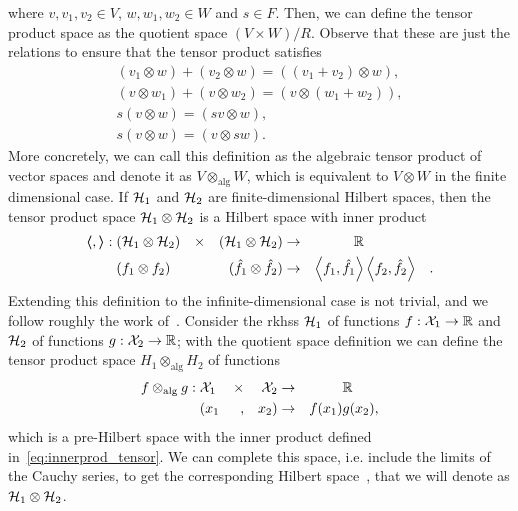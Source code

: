 where $v, v_1, v_2 \in V$, $w, w_1, w_2 \in W$ and $s \in F$. Then, we can define the tensor product space as the quotient space $(V \times W)/R$. Observe that these are just the relations to ensure that the tensor product satisfies 
\begin{align*}
    (v_1 \otimes w) + (v_2 \otimes w) = ((v_1 + v_2) \otimes w),\\
    (v \otimes w_1) + (v \otimes w_2) = (v \otimes (w_1 + w_2)), \\
    s(v \otimes w) = (sv \otimes w),                    \\
    s(v \otimes w) = (v \otimes sw).
\end{align*}
More concretely, we can call this definition as the algebraic tensor product of vector spaces and denote it as $V \otimes_{\text{alg}} W$, which is equivalent to $V \otimes W$ in the finite dimensional case.
If $\mathcal{H}_1$ and $\mathcal{H}_2$ are finite-dimensional Hilbert spaces, then the tensor product space $\mathcal{H}_1 \otimes \mathcal{H}_2$ is a Hilbert space with inner product
\begin{equation}
    \label{eq:innerprod_tensor}
    \begin{aligned}
        \dotp{}{}:\; & (\rkhs_1 \otimes \rkhs_2) & \times &  & (\rkhs_1 \otimes \rkhs_2)     & \to & \reals                &                       &   \\
                     & (f_1 \otimes f_2)         &        &  & (\hat{f}_1 \otimes \hat{f}_2) & \to & \dotp{f_1}{\hat{f}_1} & \dotp{f_2}{\hat{f}_2} & .
    \end{aligned}
\end{equation}
%
Extending this definition to the infinite-dimensional case is not trivial, and we follow roughly the work of~\citet{Kadison1983}.
Consider the \acrshort{rkhss} $\mathcal{H}_1$ of functions  $f: \mathcal{X}_1 \to \mathbb{R}$ and $\mathcal{H}_2$ of functions $g: \mathcal{X}_2 \to \mathbb{R}$; with the quotient space definition we can define the tensor product space $H_1 \otimes_{\text{alg}} H_2$ of functions
\begin{equation}\nonumber
    \begin{aligned}
        f \otimes_{\text{alg}} g:\; & \mathcal{X}_1 & \times &  & \mathcal{X}_2 & \to &        & \mathbb{R}   \\
                                    & (x_1      & ,      &  & x_2)      & \to & f(x_1) & g(x_2) ,
    \end{aligned}
\end{equation}
which is a pre-Hilbert space with the inner product defined in~\eqref{eq:innerprod_tensor}.
We can complete this space, i.e. include the limits of the Cauchy series, to get the corresponding Hilbert space~\citep{Kadison1983}, that we will denote as $\mathcal{H}_1 \otimes \mathcal{H}_2$.

